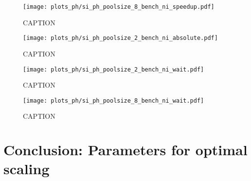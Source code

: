 \documentclass[main.tex]{subfiles}
\begin{document}
\begin{figure}[ht!]
    \centering
    \texttt{[image: plots\_ph/si\_ph\_poolsize\_8\_bench\_ni\_speedup.pdf]}
    \caption{CAPTION}
    \label{fig:scaling_ph_ni_poolsize_8_si}
\end{figure}

\begin{figure}[ht!]
    \centering
    \texttt{[image: plots\_ph/si\_ph\_poolsize\_2\_bench\_ni\_absolute.pdf]}
    \caption{CAPTION}
    \label{fig:scaling_ph_ni_poolsize_2_si_absolute}
\end{figure}

\begin{figure}[ht!]
    \centering
    \texttt{[image: plots\_ph/si\_ph\_poolsize\_2\_bench\_ni\_wait.pdf]}
    \caption{CAPTION}
    \label{fig:scaling_ph_ni_poolsize_2_si_wait}
\end{figure}

\begin{figure}[ht!]
    \centering
    \texttt{[image: plots\_ph/si\_ph\_poolsize\_8\_bench\_ni\_wait.pdf]}
    \caption{CAPTION}
    \label{fig:scaling_ph_ni_poolsize_8_si_wait}
\end{figure}

\section{Conclusion: Parameters for optimal scaling}
\end{document}
